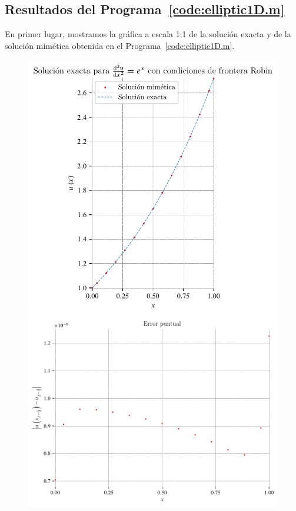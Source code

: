 \begin{problem}
\section*{Resultados del Programa~\ref{code:elliptic1D.m}}

En primer lugar, mostramos la gráfica a escala 1:1 de la solución
exacta y de la solución mimética obtenida en el Programa~\ref{code:elliptic1D.m}.

\begin{figure}[ht!]
    \centering
    \includegraphics[width=.39\paperwidth]{elliptic1D.pdf}
    \includegraphics[width=.39\paperwidth]{elliptic1Derror.pdf}

\end{figure}
\end{problem}
